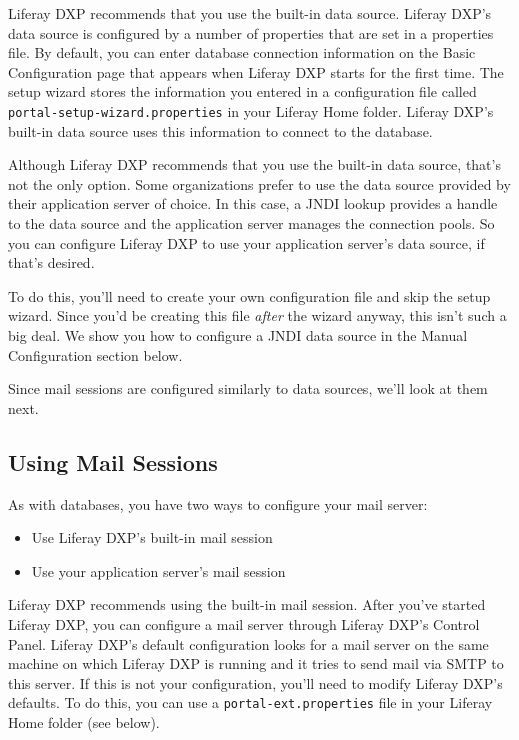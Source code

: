 Liferay DXP recommends that you use the built-in data source.
Liferay DXP's data source is configured by a number of properties that are
set in a properties file. By default, you can enter database connection
information on the Basic Configuration page that appears when Liferay
DXP starts for the first time. The setup wizard stores the information
you entered in a configuration file called
\texttt{portal-setup-wizard.properties} in your Liferay Home folder.
Liferay DXP's built-in data source uses this information to connect to
the database.

Although Liferay DXP recommends that you use the built-in data source,
that's not the only option. Some organizations prefer to use the data
source provided by their application server of choice. In this case, a
JNDI lookup provides a handle to the data source and the application
server manages the connection pools. So you can configure Liferay DXP to
use your application server's data source, if that's desired.

To do this, you'll need to create your own configuration file and skip
the setup wizard. Since you'd be creating this file \emph{after} the
wizard anyway, this isn't such a big deal. We show you how to configure
a JNDI data source in the Manual Configuration section below.

Since mail sessions are configured similarly to data sources, we'll look
at them next.

\subsection{Using Mail Sessions}\label{using-mail-sessions}

As with databases, you have two ways to configure your mail server:

\begin{itemize}
\tightlist
\item
  Use Liferay DXP's built-in mail session
\item
  Use your application server's mail session
\end{itemize}

Liferay DXP recommends using the built-in mail session. After you've
started Liferay DXP, you can configure a mail server through Liferay DXP's
Control Panel. Liferay DXP's default configuration looks for a mail
server on the same machine on which Liferay DXP is running and it tries
to send mail via SMTP to this server. If this is not your configuration,
you'll need to modify Liferay DXP's defaults. To do this, you can use a
\texttt{portal-ext.properties} file in your Liferay Home folder (see
below).

